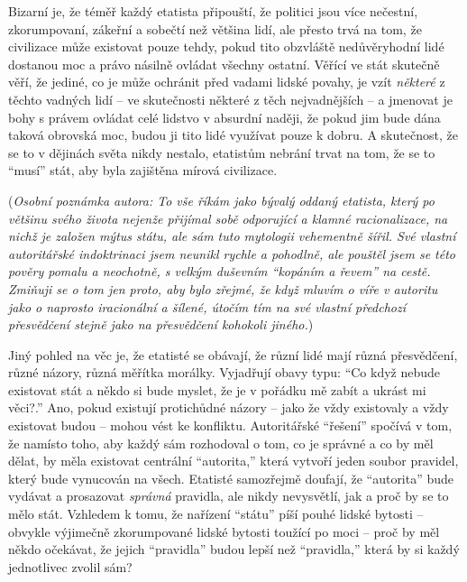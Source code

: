 \documentclass{book}
\begin{document}
Bizarní je, že téměř každý etatista připouští, že politici jsou více nečestní, zkorumpovaní, zákeřní a sobečtí než většina lidí, ale přesto trvá na tom, že civilizace může existovat pouze tehdy, pokud tito obzvláště nedůvěryhodní lidé dostanou moc a právo násilně ovládat všechny ostatní. Věřící ve stát skutečně věří, že jediné, co je může ochránit před vadami lidské povahy, je vzít \emph{některé} z těchto vadných lidí -- ve skutečnosti některé z těch nejvadnějších -- a jmenovat je bohy s právem ovládat celé lidstvo v absurdní naději, že pokud jim bude dána taková obrovská moc, budou ji tito lidé využívat pouze k dobru. A skutečnost, že se to v dějinách světa nikdy nestalo, etatistům nebrání trvat na tom, že se to \enquote{musí} stát, aby byla zajištěna mírová civilizace.

(\emph{Osobní poznámka autora: To vše říkám jako bývalý oddaný etatista, který po většinu svého života nejenže přijímal sobě odporující a klamné racionalizace, na nichž je založen mýtus státu, ale sám tuto mytologii vehementně šířil. Své vlastní autoritářské indoktrinaci jsem neunikl rychle a pohodlně, ale pouštěl jsem se této pověry pomalu a neochotně, s velkým duševním \enquote{kopáním a řevem} na cestě. Zmiňuji se o tom jen proto, aby bylo zřejmé, že když mluvím o víře v autoritu jako o naprosto iracionální a šílené, útočím tím na své vlastní předchozí přesvědčení stejně jako na přesvědčení kohokoli jiného.})

Jiný pohled na věc je, že etatisté se obávají, že různí lidé mají různá přesvědčení, různé názory, různá měřítka morálky. Vyjadřují obavy typu: \enquote{Co když nebude existovat stát a někdo si bude myslet, že je v pořádku mě zabít a ukrást mi věci?.} Ano, pokud existují protichůdné názory -- jako že vždy existovaly a vždy existovat budou -- mohou vést ke konfliktu. Autoritářské \enquote{řešení} spočívá v tom, že namísto toho, aby každý sám rozhodoval o tom, co je správné a co by měl dělat, by měla existovat centrální \enquote{autorita,} která vytvoří jeden soubor pravidel, který bude vynucován na všech. Etatisté samozřejmě doufají, že \enquote{autorita} bude vydávat a prosazovat \emph{správná} pravidla, ale nikdy nevysvětlí, jak a proč by se to mělo stát. Vzhledem k tomu, že nařízení \enquote{státu} píší pouhé lidské bytosti -- obvykle výjimečně zkorumpované lidské bytosti toužící po moci -- proč by měl někdo očekávat, že jejich \enquote{pravidla} budou lepší než \enquote{pravidla,} která by si každý jednotlivec zvolil sám?
\end{document}

